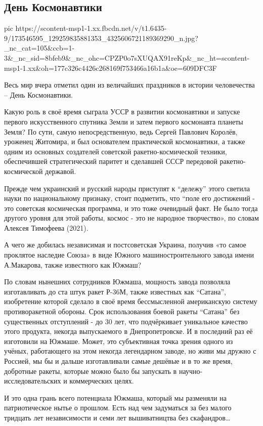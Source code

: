  
 
 
 
 

\subsection{День Космонавтики}
\label{sec:14_04_2021.fb.zharkih_ekaterina.1.kosmonavtika_ussr_vyshyvanki}


\ifcmt
  pic https://scontent-msp1-1.xx.fbcdn.net/v/t1.6435-9/173546595_129259835881353_4325606721189369290_n.jpg?_nc_cat=105&ccb=1-3&_nc_sid=8bfeb9&_nc_ohc=CPZP0o7sXUQAX91reKp&_nc_ht=scontent-msp1-1.xx&oh=177c326c4426c268169f753466a16b1a&oe=609DFC3F
\fi


Весь мир вчера отметил один из величайших праздников в истории человечества – День Космонавтики. 

Какую роль в своё время сыграла УССР в развитии космонавтики и запуске первого
искусственного спутника Земли и затем первого космонавта планеты Земля? По
сути, самую непосредственную, ведь Сергей Павлович Королёв, уроженец Житомира,
и был основателем практической космонавтики, а также одним из основных
создателей советской ракетно-космической техники, обеспечившей стратегический
паритет и сделавшей СССР передовой ракетно-космической державой. 

Прежде чем украинский и русский народы приступят к “дележу” этого светила науки
по национальному признаку, стоит подметить, что “поле его достижений - это
советская космическая программа, и это тоже очевидный факт. Не было тогда
другого уровня для этой работы, космос - это не народное творчество», по словам
Алексея Тимофеева (2021).

А чего же добилась независимая и постсоветская Украина, получив «то самое
проклятое наследие Союза» в виде Южного машиностроительного завода имени
А.Макарова, также известного как Южмаш?

По словам нынешних сотрудников Южмаша, мощность завода позволяла изготавливать
до ста штук ракет Р-36М, также известных как “Сатана”, изобретение которой
сделало в своё время бессмысленной американскую систему противоракетной
обороны. Срок использования боевой ракеты “Сатана” без существенных отступлений
- до 30 лет, что подчёркивает уникальное качество этого продукта, некогда
выпускаемого в Днепропетровске. И в последний раз её изготовили на Южмаше.
Может, это субъективная точка зрения одного из учёных, работающего на этом
некогда легендарном заводе, но живи мы дружно с Россией, мы бы и дальше
изготавливали самые дешёвые и в то же время, добротные ракеты, которые можно
было бы запускать в научно-исследовательских и коммерческих целях.

И это одна грань всего потенциала  Южмаша, который мы разменяли на
патриотическое нытье о прошлом.  Есть над чем задуматься за без малого тридцать
лет независимости и семи лет вышиватництва без скафандров…
